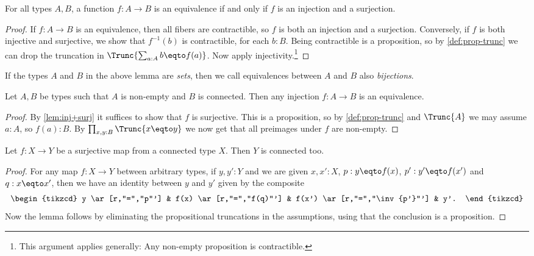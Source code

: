 \begin{lemma}\label{lem:inj+surj}
For all types $A,B$, a function $f: A\to B$ is an equivalence
if and only if $f$ is an injection and a surjection.
\end{lemma}

\begin{proof}
If $f: A\to B$ is an equivalence, then all fibers are contractible,
so $f$ is both an injection and a surjection. Conversely,
if $f$ is both injective and surjective, we show that
$f^{-1}(b)$ is contractible, for each $b:B$.
Being contractible is a proposition, so by \cref{def:prop-trunc}
we can drop the truncation in $\Trunc{\sum_{a:A} b \eqto f(a)}$.
Now apply injectivity.\footnote{%
  This argument applies generally:
  Any non-empty proposition is contractible.}
\end{proof}

If the types $A$ and $B$ in the above lemma are \emph{sets},
then we call equivalences between $A$ and $B$ also \emph{bijections}.

\begin{corollary}\label{cor:inj+connected}
Let $A,B$ be types such that $A$ is non-empty and $B$ is connected.
Then any injection $f: A\to B$ is an equivalence.
\end{corollary}
\begin{proof}
By \cref{lem:inj+surj} it suffices to show that $f$ is surjective.
This is a proposition, so by \cref{def:prop-trunc} and $\Trunc{A}$
we may assume $a:A$, so $f(a):B$. By $\prod_{x,y:B} \Trunc{x \eqto y}$
we now get that all preimages under $f$ are non-empty.
\end{proof}

\begin{lemma}\label{lem:whenisbasespaceconnected}
Let $f:X\to Y$ be a surjective map from a connected type $X$. Then $Y$ is connected too.
\end{lemma}
\begin{proof}
For any map $f:X\to Y$ between arbitrary types, if $y,y':Y$ and we are given
$x,x':X$, $p:y \eqto f(x)$, $p':y' \eqto f(x')$ and $q:x \eqto x'$,
then we have an identity between $y$ and $y'$ given by the composite
\[
  \begin{tikzcd}
    y \ar[r,"=","p"'] & f(x) \ar[r,"=","f(q)"'] & f(x') \ar[r,"=","\inv{p'}"'] & y'.
  \end{tikzcd}
\]
Now the lemma follows by eliminating the propositional truncations in the assumptions,
using that the conclusion is a proposition.
\end{proof}

